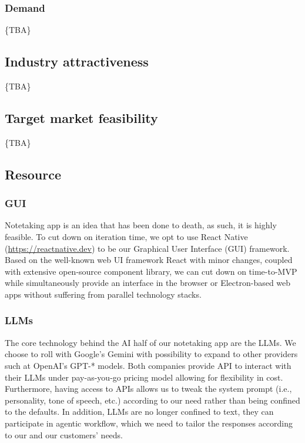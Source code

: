 \subsubsection{Demand}
\{TBA\}

\subsection{Industry attractiveness}
\{TBA\}

\subsection{Target market feasibility}
\{TBA\}

\subsection{Resource}
\subsubsection{GUI}
Notetaking app is an idea that has been done to death, as such, it is highly feasible. To cut down on
 iteration time, we opt to use React Native (\url{https://reactnative.dev}) to be our Graphical User Interface
 (GUI) framework. Based on the well-known web UI framework React with minor changes, coupled with extensive open-source
 component library, we can cut down on time-to-MVP while simultaneously provide an interface in the browser or
 Electron-based web apps without suffering from parallel technology stacks.

\subsubsection{LLMs}
The core technology behind the AI half of our notetaking app are the LLMs. We choose to roll with
 Google's Gemini with possibility to expand to other providers such at OpenAI's GPT-* models. Both companies provide
 API to interact with their LLMs under pay-as-you-go pricing model allowing for flexibility in cost. Furthermore,
 having access to APIs allows us to tweak the system prompt (i.e., personality, tone of speech, etc.) according to our
 need rather than being confined to the defaults. In addition, LLMs are no longer confined to text, they can
 participate in agentic workflow, which we need to tailor the responses according to our and our customers' needs.

